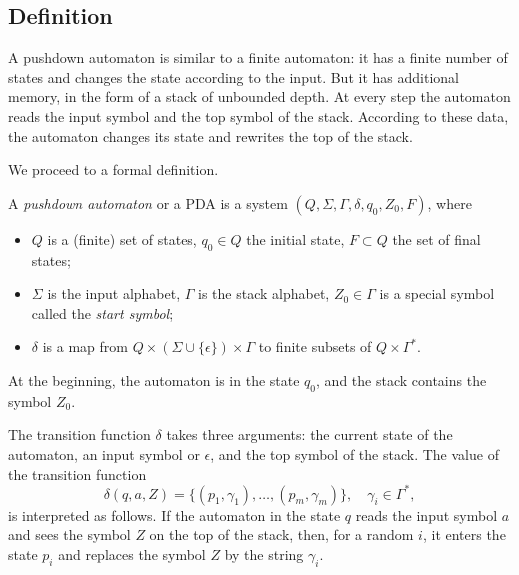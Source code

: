 \begin{page}
\setcounter{section}{6}
\setcounter{subsection}{1}
\setcounter{dfn}{0}
\label{portion:1109}

\subsection{Definition}
A pushdown automaton is similar to a finite automaton:
it has a finite number of states and changes the state according to the input.
But it has additional memory, in the form of a stack of unbounded depth.
At every step the automaton reads the input symbol and the top symbol of the stack.
According to these data, the automaton changes its state and rewrites the top of the stack.

We proceed to a formal definition.

\end{page}

\begin{page}
\setcounter{section}{6}
\setcounter{subsection}{1}
\setcounter{dfn}{1}
\label{portion:1111}

\begin{dfn}
A \emph{pushdown automaton} or a PDA is a system $(Q, \Sigma, \Gamma, \delta, q_0, Z_0, F)$, where
\begin{itemize}
\item
$Q$ is a (finite) set of states, $q_0 \in Q$ the initial state, $F \subset Q$ the set of final states;
\item
$\Sigma$ is the input alphabet, $\Gamma$ is the stack alphabet, $Z_0 \in \Gamma$ is a special symbol called the \emph{start symbol};
\item
$\delta$ is a map from $Q \times (\Sigma \cup \{\epsilon\}) \times \Gamma$ to finite subsets of $Q \times \Gamma^*$.
\end{itemize}
\end{dfn}

\end{page}

\begin{page}
\setcounter{section}{6}
\setcounter{subsection}{1}
\setcounter{dfn}{1}
\label{portion:1112}

At the beginning, the automaton is in the state $q_0$, and the stack contains the symbol $Z_0$.

The transition function $\delta$ takes three arguments:
the current state of the automaton, an input symbol or $\epsilon$, and the top symbol of the stack.
The value of the transition function
\[
\delta(q, a, Z) = \{(p_1, \gamma_1), \ldots, (p_m, \gamma_m)\}, \quad \gamma_i \in \Gamma^*,
\]
is interpreted as follows.
If the automaton in the state $q$ reads the input symbol $a$ and sees the symbol $Z$ on the top of the stack,
then, for a random $i$, it enters the state $p_i$ and replaces the symbol $Z$ by the string $\gamma_i$.


\end{page}

